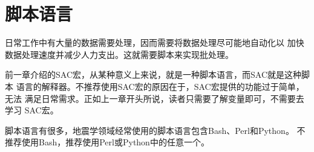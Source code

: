 \section{脚本语言}
日常工作中有大量的数据需要处理，因而需要将数据处理尽可能地自动化以
加快数据处理速度并减少人力支出。这就需要脚本来实现批处理。

前一章介绍的SAC宏，从某种意义上来说，就是一种脚本语言，而SAC就是这种脚本
语言的解释器。不推荐使用SAC宏的原因在于，SAC宏提供的功能过于简单，无法
满足日常需求。正如上一章开头所说，读者只需要了解变量即可，不需要去学习
SAC宏。

脚本语言有很多，地震学领域经常使用的脚本语言包含Bash、Perl和Python。
不推荐使用Bash，推荐使用Perl或Python中的任意一个。

